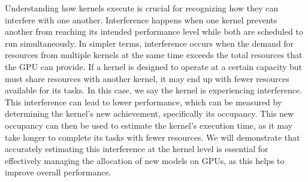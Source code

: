 
Understanding how kernels execute is crucial for recognizing how they can interfere with one another. Interference happens when one kernel prevents another from reaching its intended performance level while both are scheduled to run simultaneously. In simpler terms, interference occurs when the demand for resources from multiple kernels at the same time exceeds the total resources that the GPU can provide. If a kernel is designed to operate at a certain capacity but must share resources with another kernel, it may end up with fewer resources available for its tasks. In this case, we say the kernel is experiencing interference.
This interference can lead to lower performance, which can be measured by determining the kernel's new achievement, specifically its occupancy. This new occupancy can then be used to estimate the kernel's execution time, as it may take longer to complete its tasks with fewer resources. We will demonstrate that accurately estimating this interference at the kernel level is essential for effectively managing the allocation of new models on GPUs, as this helps to improve overall performance.

